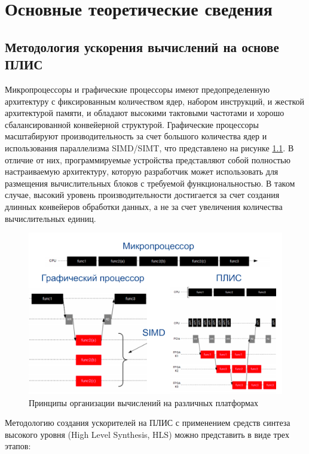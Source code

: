 \chapter{Основные теоретические сведения}

\section{Методология ускорения вычислений на основе ПЛИС}

Микропроцессоры и графические процессоры имеют предопределенную архитектуру с фиксированным количеством ядер, набором инструкций, и жесткой архитектурой памяти, и обладают высокими тактовыми частотами и хорошо сбалансированной конвейерной структурой. Графические процессоры масштабируют производительность за счет большого количества ядер и использования параллелизма SIMD/SIMT, что представлено на рисунке \ref{img:scheme}. В отличие от них, программируемые устройства представляют собой полностью настраиваемую архитектуру, которую разработчик может использовать для размещения вычислительных блоков с требуемой функциональностью. В таком случае, высокий уровень производительности достигается за счет создания длинных конвейеров обработки данных, а не за счет увеличения количества вычислительных единиц.

\begin{figure}[H]
	\begin{center}
		\includegraphics[scale=0.4]{img/scheme.png}
	\end{center}
	\captionsetup{justification=centering}
	\caption{Принципы организации вычислений на различных
платформах}
	\label{img:scheme}
\end{figure}

Методологию создания ускорителей на ПЛИС с применением средств синтеза высокого уровня (High Level Synthesis, HLS) можно представить в виде трех этапов:


